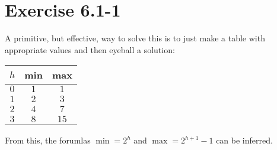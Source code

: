 \documentclass{article}
\begin{document}
\section*{Exercise 6.1-1}

A primitive, but effective, way to solve this is to just make a table with appropriate values and then eyeball a solution:
\begin{center}
\begin{tabular}{c c c}
	$h$ & min & max \\ \hline
	$0$ & $1$ & $1$ \\
	$1$ & $2$ & $3$ \\
	$2$ & $4$ & $7$ \\
	$3$ & $8$ & $15$ \\
\end{tabular}
\end{center}
From this, the forumlas $\min = 2^h$ and $\max = 2^{h+1} - 1$ can be inferred.
\end{document}
